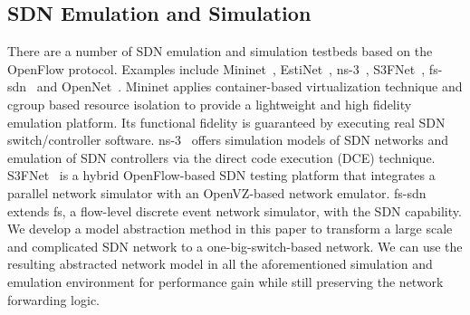 \subsection{SDN Emulation and Simulation}
There are a number of SDN emulation and simulation testbeds based on the OpenFlow
protocol.
Examples include Mininet~\cite{Mininet}, EstiNet~\cite{EstiNet}, ns-3~\cite{NS3},
S3FNet~\cite{S3F_website}, fs-sdn~\cite{FSSDN} and OpenNet~\cite{OpenNet}.
Mininet  \cite{Mininet} applies container-based virtualization technique and cgroup based resource isolation to provide a lightweight and high fidelity emulation
platform.
Its functional fidelity is guaranteed by executing real SDN switch/controller software.
ns-3~\cite{NS3} offers simulation models of SDN networks and emulation of SDN controllers via the direct code execution (DCE) technique.
S3FNet~\cite{S3F_website} is a hybrid OpenFlow-based SDN testing platform that integrates a parallel network simulator with an OpenVZ-based network emulator.
fs-sdn~\cite{FSSDN} extends fs, a flow-level discrete event network simulator, with the SDN capability.
We develop a model abstraction method in this paper to transform a large scale and complicated SDN network to a one-big-switch-based network.
We can use the resulting abstracted network model in all the aforementioned simulation and emulation environment for performance gain while still preserving the network forwarding logic.
